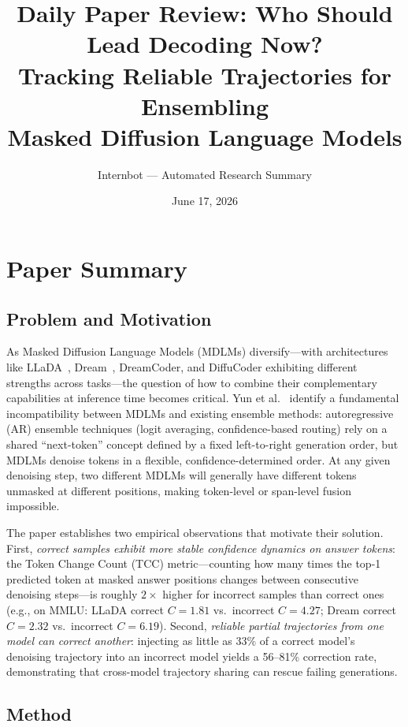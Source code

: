\documentclass[11pt,a4paper]{article}
\title{Daily Paper Review: Who Should Lead Decoding Now?\\Tracking Reliable Trajectories for Ensembling\\Masked Diffusion Language Models}
\author{Internbot --- Automated Research Summary}
\date{June 17, 2026}
\begin{document}
\maketitle

\section{Paper Summary}

\subsection{Problem and Motivation}

As Masked Diffusion Language Models (MDLMs) diversify---with architectures like LLaDA~\cite{nie2026llada}, Dream~\cite{dream2026}, DreamCoder, and DiffuCoder exhibiting different strengths across tasks---the question of how to combine their complementary capabilities at inference time becomes critical. Yun et al.~\cite{yun2026tie} identify a fundamental incompatibility between MDLMs and existing ensemble methods: autoregressive (AR) ensemble techniques (logit averaging, confidence-based routing) rely on a shared ``next-token'' concept defined by a fixed left-to-right generation order, but MDLMs denoise tokens in a flexible, confidence-determined order. At any given denoising step, two different MDLMs will generally have different tokens unmasked at different positions, making token-level or span-level fusion impossible.

The paper establishes two empirical observations that motivate their solution. First, \emph{correct samples exhibit more stable confidence dynamics on answer tokens}: the Token Change Count (TCC) metric---counting how many times the top-1 predicted token at masked answer positions changes between consecutive denoising steps---is roughly $2\times$ higher for incorrect samples than correct ones (e.g., on MMLU: LLaDA correct $C=1.81$ vs.\ incorrect $C=4.27$; Dream correct $C=2.32$ vs.\ incorrect $C=6.19$). Second, \emph{reliable partial trajectories from one model can correct another}: injecting as little as 33\% of a correct model's denoising trajectory into an incorrect model yields a 56--81\% correction rate, demonstrating that cross-model trajectory sharing can rescue failing generations.

\subsection{Method}
\end{document}
